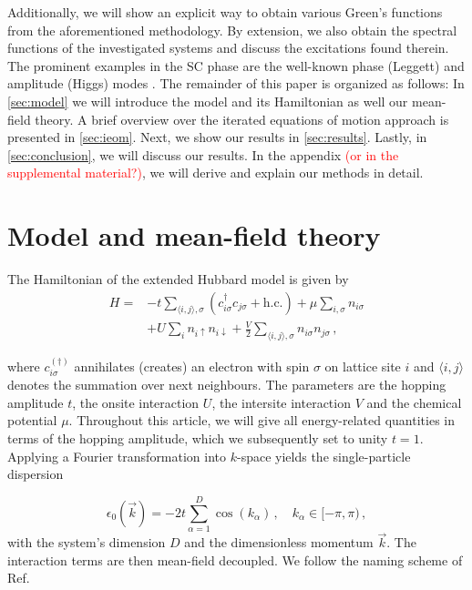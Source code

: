 \documentclass[
    reprint, 
    aps,
    preprintnumbers,
    twocolumn,
    prb,
    superscriptaddress
]{revtex4-2}
\newcommand{\vk}{\vec{k}}
\begin{document}
Additionally, we will show an explicit way to obtain various Green's functions from the aforementioned methodology.
By extension, we also obtain the spectral functions of the investigated systems and discuss the excitations found therein.
The prominent examples in the SC phase are the well-known phase (Leggett) and amplitude (Higgs) modes \cite{Cea14,Krull16,Schwarz20,Fan22}.
\newline
The remainder of this paper is organized as follows:
In \autoref{sec:model} we will introduce the model and its Hamiltonian as well our mean-field theory.
A brief overview over the iterated equations of motion approach is presented in \autoref{sec:ieom}.
Next, we show our results in \autoref{sec:results}.
Lastly, in \autoref{sec:conclusion}, we will discuss our results.
In the appendix \textcolor{red}{(or in the supplemental material?)}, we will derive and explain our methods in detail.

\section{Model and mean-field theory}\label{sec:model}

The Hamiltonian of the extended Hubbard model is given by
\begin{equation}
    \label{eqn:full_hamiltonian}
    \begin{aligned}
        H = &-t \sum_{\langle i, j \rangle, \sigma} \left( c_{i\sigma}^\dagger c_{j\sigma} + \text{h.c.} \right) 
        + \mu \sum_{i,\sigma} n_{i\sigma} \\
        &+ U \sum_{i} n_{i\uparrow} n_{i\downarrow} 
        + \frac{V}{2} \sum_{\langle i, j\rangle, \sigma} n_{i\sigma} n_{j\sigma}\,,
    \end{aligned}
\end{equation}

where $c_{i\sigma}^{(\dagger)}$ annihilates (creates) an electron with spin $\sigma$ on lattice site $i$ and $\langle i, j\rangle$ denotes the summation over next neighbours.
The parameters are the hopping amplitude $t$, the onsite interaction $U$, the intersite interaction $V$ and the chemical potential $\mu$.
Throughout this article, we will give all energy-related quantities in terms of the hopping amplitude, which we subsequently set to unity $t=1$.
Applying a Fourier transformation into $k$-space yields the single-particle dispersion 

\begin{equation}
    \epsilon_0 (\vk) = -2t \sum_{\alpha=1}^D \cos(k_\alpha)\,,\quad k_\alpha \in [-\pi, \pi)\,,
\end{equation}
with the system's dimension $D$ and the dimensionless momentum $\vk$.
The interaction terms are then mean-field decoupled. 
We follow the naming scheme of Ref. \cite{sentef17}
\end{document}
